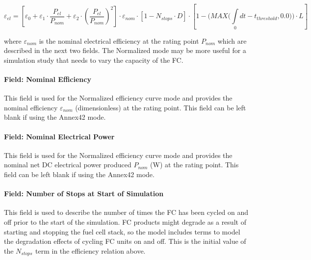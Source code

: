 \begin{equation}
{\varepsilon_{el}} = \left[ {{\varepsilon_0} + {\varepsilon_1} \cdot \frac{{{P_{el}}}}{{{P_{nom}}}} + {\varepsilon_2} \cdot {{\left( {\frac{{{P_{el}}}}{{{P_{nom}}}}} \right)}^2}} \right] \cdot {\varepsilon_{nom}} \cdot \left[ {1 - {N_{stops}} \cdot D} \right] \cdot \left[ {1 - (MAX(\int\limits_0 {dt - {t_{threshold}},0.0))}  \cdot L} \right]
\end{equation}

where \({\varepsilon_{nom}}\) is the nominal electrical efficiency at the rating point \({P_{nom}}\) which are described in the next two fields. The Normalized mode may be more useful for a simulation study that needs to vary the capacity of the FC.

\paragraph{Field: Nominal Efficiency}\label{field-nominal-efficiency}

This field is used for the Normalized efficiency curve mode and provides the nominal efficiency \({\varepsilon_{nom}}\) (dimensionless) at the rating point. This field can be left blank if using the Annex42 mode.

\paragraph{Field: Nominal Electrical Power}\label{field-nominal-electrical-power}

This field is used for the Normalized efficiency curve mode and provides the nominal net DC electrical power produced \({P_{nom}}\) (W) at the rating point. This field can be left blank if using the Annex42 mode.

\paragraph{Field: Number of Stops at Start of Simulation}\label{field-number-of-stops-at-start-of-simulation}

This field is used to describe the number of times the FC has been cycled on and off prior to the start of the simulation. FC products might degrade as a result of starting and stopping the fuel cell stack, so the model includes terms to model the degradation effects of cycling FC units on and off. This is the initial value of the \({N_{stops}}\) \emph{\(_{}\)}term in the efficiency relation above.

